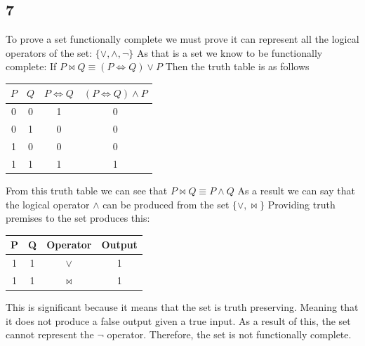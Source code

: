 \documentclass{article}
\begin{document}
	\subsection*{7}
	To prove a set functionally complete we must prove it can represent all the logical operators of the set:
	\newline
	$\{\lor,\land,\neg\}$
	\newline
	As that is a set we know to be functionally complete:
	\newline
	If $P \bowtie Q \equiv (P \iff Q) \lor P$
	\newline 
	Then the truth table is as follows
	\begin{center}
	\begin{tabular}{|c|c|c|c|}
	\hline
	$P$ & $Q$ & $P\iff Q$ & $ (P \iff Q) \land P$\\
	\hline
	0&0&1&0\\
	\hline
	0&1&0&0\\
	\hline
	1&0&0&0\\
	\hline
	1&1&1&1\\
	\hline
	\end{tabular}
	\end{center}
	From this truth table we can see that $P \bowtie Q \equiv P \land Q$
	\newline
	As a result we can say that the logical operator $\land$ can be produced from the set $  \{\lor,\bowtie\}$
	\newline
	Providing truth premises to the set produces this:
	\newline
	\begin{center}
	\begin{tabular}{|c|c|c|c|}
	\hline
	P&Q&Operator&Output\\
	\hline
	1&1&$\lor$&1\\
	\hline
	1&1&$\bowtie$&1\\
	\hline
	\end{tabular}
	\end{center}
	This is significant because it means that the set is truth preserving. Meaning that it does not produce a false output given a true input. As a result of this, the set cannot represent the $\neg$ operator. 
	\newline
	Therefore, the set is not functionally complete.
\end{document}
